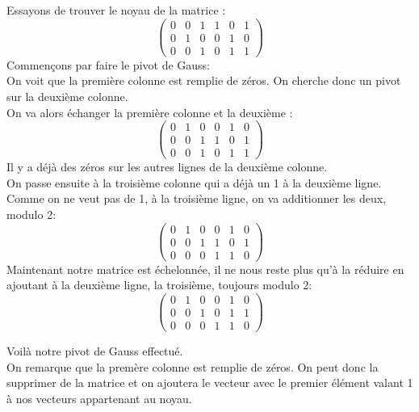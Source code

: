 \begin{example}
    Essayons de trouver le noyau de la matrice :
    \[\begin{pmatrix}
        0 & 0 & 1 & 1 & 0 & 1\\
        0 & 1 & 0 & 0 & 1 & 0\\
        0 & 0 & 1 & 0 & 1 & 1
    \end{pmatrix}\]
    Commençons par faire le pivot de Gauss:\\
    On voit que la première colonne est remplie de zéros. On cherche donc un pivot sur la deuxième colonne. \\
    On va alors échanger la première colonne et la deuxième : 
    \[\begin{pmatrix}
        0 & 1 & 0 & 0 & 1 & 0\\
        0 & 0 & 1 & 1 & 0 & 1\\
        0 & 0 & 1 & 0 & 1 & 1
    \end{pmatrix}\]
    Il y a déjà des zéros sur les autres lignes de la deuxième colonne.\\
    On passe ensuite à la troisième colonne qui a déjà un 1 à la deuxième ligne.
    Comme on ne veut pas de 1, à la troisième ligne, on va additionner les deux, modulo 2:
    \[\begin{pmatrix}
        0 & 1 & 0 & 0 & 1 & 0\\
        0 & 0 & 1 & 1 & 0 & 1\\
        0 & 0 & 0 & 1 & 1 & 0
    \end{pmatrix}\]
    Maintenant notre matrice est échelonnée, il ne nous reste plus qu'à la réduire en ajoutant à la deuxième ligne, la troisième, toujours modulo 2:
    \[\begin{pmatrix}
        0 & 1 & 0 & 0 & 1 & 0\\
        0 & 0 & 1 & 0 & 1 & 1\\
        0 & 0 & 0 & 1 & 1 & 0
    \end{pmatrix}\]

    Voilà notre pivot de Gauss effectué. \\
    On remarque que la premère colonne est remplie de zéros. 
    On peut donc la supprimer de la matrice et on ajoutera le vecteur avec le premier élément valant 1 à nos vecteurs appartenant au noyau.\\


\end{example}
